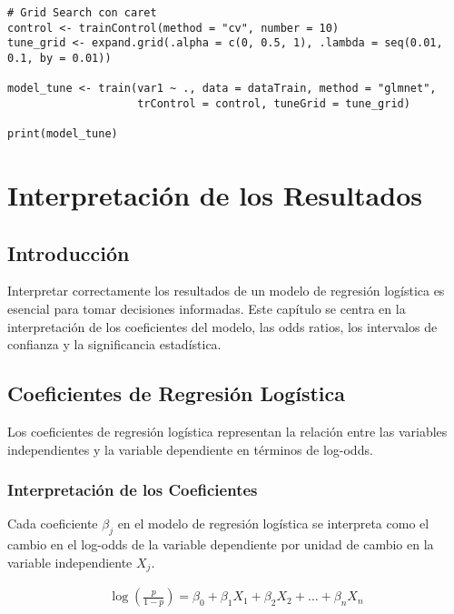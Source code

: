 \documentclass[a4paper]{report} %
\begin{document}
\begin{verbatim}
# Grid Search con caret
control <- trainControl(method = "cv", number = 10)
tune_grid <- expand.grid(.alpha = c(0, 0.5, 1), .lambda = seq(0.01, 0.1, by = 0.01))

model_tune <- train(var1 ~ ., data = dataTrain, method = "glmnet", 
                    trControl = control, tuneGrid = tune_grid)

print(model_tune)
\end{verbatim}


\chapter{Interpretaci\'on de los Resultados}
\section{Introducci\'on}

Interpretar correctamente los resultados de un modelo de regresi\'on log\'istica es esencial para tomar decisiones informadas. Este cap\'itulo se centra en la interpretaci\'on de los coeficientes del modelo, las odds ratios, los intervalos de confianza y la significancia estad\'istica.

\section{Coeficientes de Regresi\'on Log\'istica}

Los coeficientes de regresi\'on log\'istica representan la relaci\'on entre las variables independientes y la variable dependiente en t\'erminos de log-odds. 

\subsection{Interpretaci\'on de los Coeficientes}

Cada coeficiente $\beta_j$ en el modelo de regresi\'on log\'istica se interpreta como el cambio en el log-odds de la variable dependiente por unidad de cambio en la variable independiente $X_j$.

\begin{eqnarray*}
\log\left(\frac{p}{1-p}\right) = \beta_0 + \beta_1 X_1 + \beta_2 X_2 + \ldots + \beta_n X_n
\end{eqnarray*}
\end{document}
